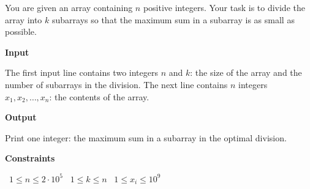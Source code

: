 You are given an array containing $n$ positive integers.
Your task is to divide the array into $k$ subarrays so that the maximum sum in a subarray is as small as possible.

\vspace{0.3cm}\noindent\textbf{Input}

The first input line contains two integers $n$ and $k$: the size of the array and the number of subarrays in the division.
The next line contains $n$ integers $x_1,x_2,\ldots,x_n$: the contents of the array.

\vspace{0.3cm}\noindent\textbf{Output}

Print one integer: the maximum sum in a subarray in the optimal division.

\vspace{0.3cm}\noindent\textbf{Constraints}

\textbullet\ $1 \le n \le 2 \cdot 10^5$
\textbullet\ $1 \le k \le n$
\textbullet\ $1 \le x_i \le 10^9$